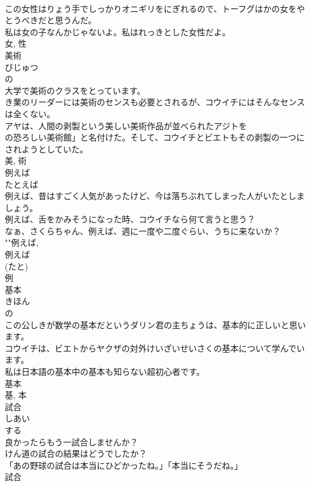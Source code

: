 \documentclass[8pt]{extreport}
\begin{document}
\begin{CJK}{UTF8}{min}
\\	この女性はりょう手でしっかりオニギリをにぎれるので、トーフグはかの女をやとうべきだと思うんだ。	
\\	私は女の子なんかじゃないよ。私はれっきとした女性だよ。	
\\	女, 性	
\\	美術	
\\	びじゅつ	
\\	の 
\\	大学で美術のクラスをとっています。	
\\	き業のリーダーには美術のセンスも必要とされるが、コウイチにはそんなセンスは全くない。	
\\	アヤは、人間の剥製という美しい美術作品が並べられたアジトを
\\	の恐ろしい美術館」と名付けた。そして、コウイチとビエトもその剥製の一つにされようとしていた。	
\\	美, 術	
\\	例えば	
\\	たとえば	
\\	例えば、昔はすごく人気があったけど、今は落ちぶれてしまった人がいたとしましょう。	
\\	例えば、舌をかみそうになった時、コウイチなら何て言うと思う？	
\\	なぁ、さくらちゃん、例えば、週に一度や二度ぐらい、うちに来ないか？	
\\	""例えば, 
\\	例えば 
\\	(たと) 
\\	例	
\\	基本	
\\	きほん	
\\	の 
\\	この公しきが数学の基本だというダリン君の主ちょうは、基本的に正しいと思います。	
\\	コウイチは、ビエトからヤクザの対外けいざいせいさくの基本について学んでいます。	
\\	私は日本語の基本中の基本も知らない超初心者です。	
\\	基本 
\\	基, 本	
\\	試合	
\\	しあい	
\\	する 
\\	良かったらもう一試合しませんか？	
\\	けん道の試合の結果はどうでしたか？	
\\	「あの野球の試合は本当にひどかったね。」「本当にそうだね。」	
\\	試合 

\end{CJK}
\end{document}
